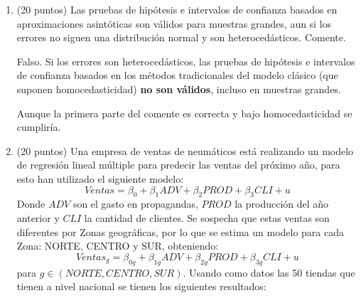 \documentclass[10pt,a4paper]{article}
\begin{document}
\begin{enumerate}
{\begin{enumerate}
    \item \textbf{Muestra aleatoria:} las observaciones \((y_i, x_{1i}, \dots, x_{ki})\) provienen de una muestra aleatoria e independiente de la población.
    
    \item \textbf{No multicolinealidad perfecta:} las variables explicativas no están perfectamente correlacionadas; la matriz \(X'X\) es de rango completo.
    
    \item \textbf{Exogeneidad:} el valor esperado del término de error, dado el conjunto de regresores, es cero:
    \[
    E(u_i \mid X_i) = 0.
    \]
\end{enumerate}

Bajo estos cuatro supuestos, el estimador MCO es insesgado y consistente, ya que
\[
\hat{\beta} = (X'X)^{-1} X'y
\]
converge en probabilidad a \(\beta\) cuando el tamaño muestral \(n \to \infty\). 

La homocedasticidad (supuesto 5) y la normalidad de los errores no son necesarias para la consistencia, sino para la eficiencia (teorema de Gauss--Markov) y la validez exacta de los contrastes de hipótesis.

}
    \item (20 puntos)
    Las pruebas de hipótesis e intervalos de confianza basados en aproximaciones asintóticas son válidos para muestras grandes, aun si los errores no siguen una distribución normal y son heterocedásticos. Comente.

{\color{blue} Falso. Si los errores son heterocedásticos, las pruebas de hipótesis e intervalos de confianza basados en los métodos tradicionales del modelo clásico (que suponen homocedasticidad) \textbf{no son válidos}, incluso en muestras grandes.


Aunque la primera parte del comente es correcta y bajo homocedasticidad se cumpliría.


}

\item (20 puntos) Una empresa de ventas de neumáticos está realizando un modelo de regresión lineal múltiple para predecir las ventas del próximo año, para esto han utilizado el siguiente modelo:
$$Ventas = \beta_0 + \beta_1ADV + \beta_2PROD+\beta_3CLI + u$$
Donde $ADV$ son el gasto en propagandas, $PROD$ la producción del año anterior y $CLI$ la cantidad de clientes. Se sospecha que estas ventas son diferentes por Zonas geográficas, por lo que se estima un modelo para cada Zona: NORTE, CENTRO y SUR, obteniendo: 
$$Ventas_{g} = \beta_{0g} + \beta_{1g}ADV + \beta_{2g}PROD+\beta_{3g}CLI + u$$
para $g \in {(NORTE,CENTRO,SUR)}$. Usando como datos las 50 tiendas que tienen a nivel nacional se tienen los siguientes resultados:


\end{enumerate}
\end{document}
